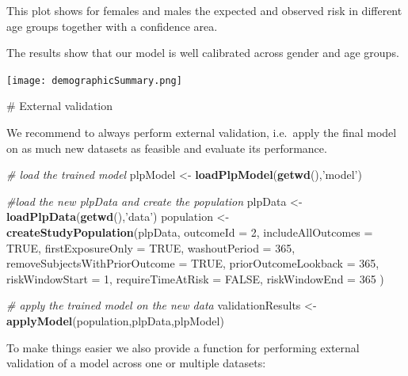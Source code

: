 \documentclass[
]{article}
\newenvironment{Shaded}{\begin{snugshade}}{\end{snugshade}}
\newcommand{\CommentTok}[1]{\textcolor[rgb]{0.56,0.35,0.01}{\textit{#1}}}
\newcommand{\DataTypeTok}[1]{\textcolor[rgb]{0.13,0.29,0.53}{#1}}
\newcommand{\DecValTok}[1]{\textcolor[rgb]{0.00,0.00,0.81}{#1}}
\newcommand{\KeywordTok}[1]{\textcolor[rgb]{0.13,0.29,0.53}{\textbf{#1}}}
\newcommand{\NormalTok}[1]{#1}
\newcommand{\OtherTok}[1]{\textcolor[rgb]{0.56,0.35,0.01}{#1}}
\newcommand{\StringTok}[1]{\textcolor[rgb]{0.31,0.60,0.02}{#1}}
\begin{document}
This plot shows for females and males the expected and observed risk in
different age groups together with a confidence area.

The results show that our model is well calibrated across gender and age
groups.

\texttt{[image: demographicSummary.png]}

\newpage \# External validation

We recommend to always perform external validation, i.e.~apply the final
model on as much new datasets as feasible and evaluate its performance.

\begin{Shaded}
\begin{Highlighting}[]
\CommentTok{# load the trained model}
\NormalTok{plpModel <-}\StringTok{ }\KeywordTok{loadPlpModel}\NormalTok{(}\KeywordTok{getwd}\NormalTok{(),}\StringTok{'model'}\NormalTok{)}

\CommentTok{#load the new plpData and create the population}
\NormalTok{plpData <-}\StringTok{ }\KeywordTok{loadPlpData}\NormalTok{(}\KeywordTok{getwd}\NormalTok{(),}\StringTok{'data'}\NormalTok{)}
\NormalTok{population <-}\StringTok{ }\KeywordTok{createStudyPopulation}\NormalTok{(plpData, }
                                    \DataTypeTok{outcomeId =} \DecValTok{2}\NormalTok{, }
                                    \DataTypeTok{includeAllOutcomes =} \OtherTok{TRUE}\NormalTok{, }
                                    \DataTypeTok{firstExposureOnly =} \OtherTok{TRUE}\NormalTok{, }
                                    \DataTypeTok{washoutPeriod =} \DecValTok{365}\NormalTok{, }
                                    \DataTypeTok{removeSubjectsWithPriorOutcome =} \OtherTok{TRUE}\NormalTok{, }
                                    \DataTypeTok{priorOutcomeLookback =} \DecValTok{365}\NormalTok{,}
                                    \DataTypeTok{riskWindowStart =} \DecValTok{1}\NormalTok{,}
                                    \DataTypeTok{requireTimeAtRisk =} \OtherTok{FALSE}\NormalTok{,}
                                    \DataTypeTok{riskWindowEnd =} \DecValTok{365}
\NormalTok{)}

\CommentTok{# apply the trained model on the new data}
\NormalTok{validationResults <-}\StringTok{ }\KeywordTok{applyModel}\NormalTok{(population,plpData,plpModel)}
\end{Highlighting}
\end{Shaded}

To make things easier we also provide a function for performing external
validation of a model across one or multiple datasets:
\end{document}
